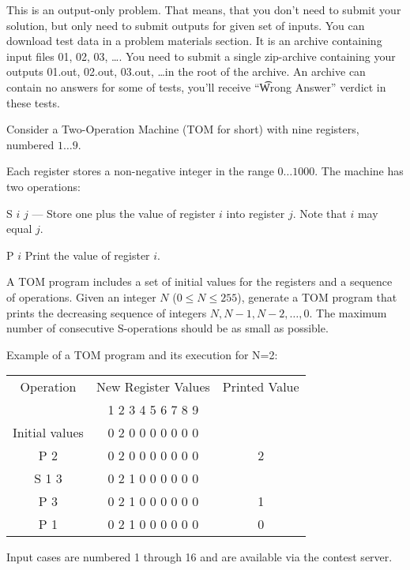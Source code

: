 This is an output-only problem. That means, that you don't need to submit your solution, but only need to submit outputs for given set of inputs. You can download test data in a problem materials section. It is an archive containing input files 01, 02, 03, \dots. You need to submit a single zip-archive containing your outputs 01.out, 02.out, 03.out, \dots in the root of the archive.  An archive can contain no answers for some of tests, you'll receive ``\t{Wrong Answer}'' verdict in these tests.

Consider a Two-Operation Machine (TOM for short) with nine registers, numbered $1 \ldots 9$. 

Each register stores a non-negative integer in the range $0 \ldots 1000$. The machine has two operations:

S $i$ $j$ --- Store one plus the value of register $i$ into register $j$. Note that $i$ may equal $j$.

P $i$ Print the value of register $i$.

A TOM program includes a set of initial values for the registers and a sequence of operations. Given an integer $N$ ($0 \le N \le 255$), generate a TOM program that prints the decreasing sequence of integers $N, N-1, N-2, \ldots, 0$. The maximum number of consecutive S-operations should be as small as possible.

Example of a TOM program and its execution for N=2:

\begin{tabular}{|c|c|c|}
\hline
Operation & New  Register Values & Printed Value \\ 
& 1 2 3 4 5 6 7 8 9 &  \\ \hline
Initial values & 0 2 0 0 0 0 0 0 0 & \\ \hline
P 2 & 0 2 0 0 0 0 0 0 0 & 2 \\ \hline
S 1 3 & 0 2 1 0 0 0 0 0 0 & \\ \hline
P 3 & 0 2 1 0 0 0 0 0 0 & 1 \\ \hline
P 1 & 0 2 1 0 0 0 0 0 0 & 0 \\ \hline
\end{tabular}

Input cases are numbered 1 through 16 and are available via the contest server.